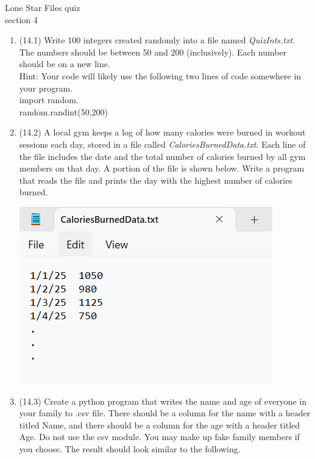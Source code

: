 \documentclass{article}
\newcommand{\tab}{\hspace*{0.25in}}
\begin{document}

Lone Star \hfill Files quiz\\
section 4\\
\begin{enumerate}
\item (14.1) 
		Write 100 integers created randomly into a file named \textit{QuizInts.txt}. 
		The numbers should be between 50 and 200 (inclusively). 
		Each number should be on a new line.\\
		Hint: Your code will likely use the following two lines of code somewhere in your program.\\
			\tab import random.\\
			\tab random.randint(50,200)

\item (14.2) 
		A local gym keeps a log of how many calories were burned in workout sessions each day, stored in a file called \textit{CaloriesBurnedData.txt}.  
		Each line of the file includes the date and the total number of calories burned by all gym members on that day.  
		A portion of the file is shown below.  
		Write a program that reads the file and prints the day with the highest number of calories burned.
		
		\begin{flushright}
			\includegraphics[scale=.65]{imgs/CaloriesBurnedData.PNG}
		\end{flushright}


\item (14.3) 
		Create a python program that writes the name and age of everyone in your family to .csv file.
		There should be a column for the name with a header titled Name, and there should be a column 
		for the age with a header titled Age.
		Do not use the csv module. You may make up fake family members if you choose. The result
		should look similar to the following.
		

\end{enumerate}
\end{document}
